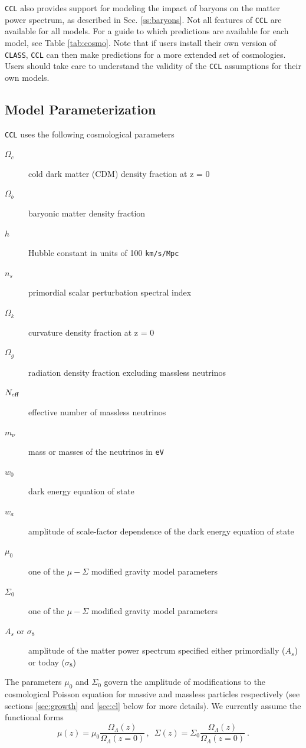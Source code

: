 \documentclass[\docopts]{\docclass}
\newcommand{\ccl}{{\tt CCL}\xspace}
\begin{document}
\ccl also provides support for modeling the impact of baryons on the matter
power spectrum, as described in Sec. \ref{ss:baryons}. Not all features of \ccl
are available for all models. For a guide to which predictions are available for
each model, see Table \ref{tab:cosmo}. Note that if users install their own
version of {\tt CLASS}, {\tt CCL} can then make predictions for a more extended
set of cosmologies. Users should take care to understand the validity of the
{\tt CCL} assumptions for their own models.



\subsection{Model Parameterization}

\ccl uses the following cosmological parameters

\begin{description}
  \item[$\Omega_c$] cold dark matter (CDM) density fraction at z = 0
  \item[$\Omega_b$] baryonic matter density fraction
  \item[$h$] Hubble constant in units of 100 {\tt km/s/Mpc}
  \item[$n_s$] primordial scalar perturbation spectral index
  \item[$\Omega_k$] curvature density fraction at z = 0
  \item[$\Omega_g$] radiation density fraction excluding massless neutrinos
  \item[$N_{\rm eff}$] effective number of massless neutrinos
  \item[$m_\nu$] mass or masses of the neutrinos in {\tt eV}
  \item[$w_0$] dark energy equation of state
  \item[$w_a$] amplitude of scale-factor dependence of the dark energy equation of state
  \item[$\mu_0$] one of the $\mu-\Sigma$ modified gravity model parameters
  \item[$\Sigma_0$] one of the $\mu-\Sigma$ modified gravity model parameters
  \item[$A_s$ or $\sigma_8$] amplitude of the matter power spectrum specified either
  primordially ($A_s$) or today ($\sigma_8$)
\end{description}

The parameters $\mu_0$ and $\Sigma_0$ govern the amplitude of modifications to
the cosmological Poisson equation for massive and massless particles respectively
(see sections \ref{sec:growth} and \ref{sec:cl} below for more details). We
currently assume the functional forms \citep{Ferreira2010}
\begin{equation}
\mu(z) = \mu_0 \frac{\Omega_\Lambda(z)}{\Omega_\Lambda(z=0)}\, , \,\,\,
\Sigma(z) = \Sigma_0 \frac{\Omega_\Lambda(z)}{\Omega_\Lambda(z=0)}\ .
\label{muSigform}
\end{equation}
\end{document}

